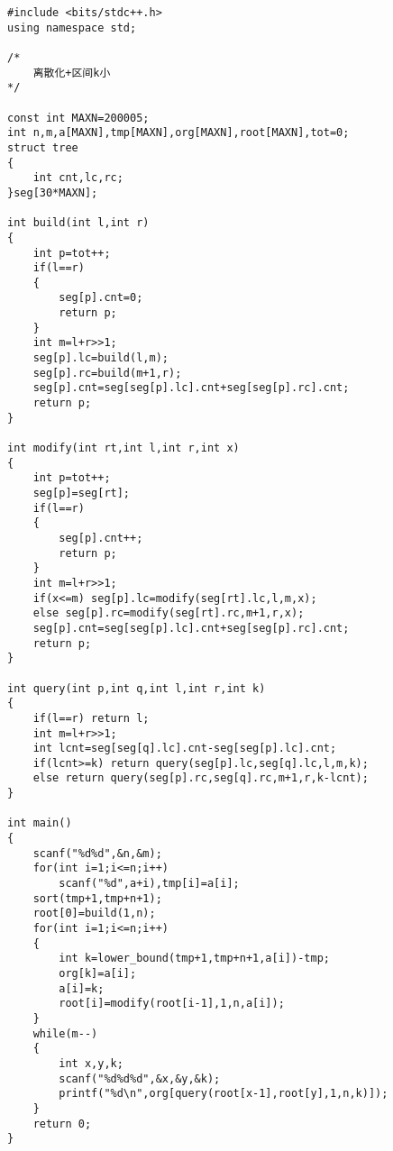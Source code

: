 \begin{lstlisting}
#include <bits/stdc++.h>
using namespace std;

/*
    离散化+区间k小
*/

const int MAXN=200005;
int n,m,a[MAXN],tmp[MAXN],org[MAXN],root[MAXN],tot=0;
struct tree
{
    int cnt,lc,rc;
}seg[30*MAXN];

int build(int l,int r)
{
    int p=tot++;
    if(l==r)
    {
        seg[p].cnt=0;
        return p;
    }
    int m=l+r>>1;
    seg[p].lc=build(l,m);
    seg[p].rc=build(m+1,r);
    seg[p].cnt=seg[seg[p].lc].cnt+seg[seg[p].rc].cnt;
    return p;
}

int modify(int rt,int l,int r,int x)
{
    int p=tot++;
    seg[p]=seg[rt];
    if(l==r)
    {
        seg[p].cnt++;
        return p;
    }
    int m=l+r>>1;
    if(x<=m) seg[p].lc=modify(seg[rt].lc,l,m,x);
    else seg[p].rc=modify(seg[rt].rc,m+1,r,x);
    seg[p].cnt=seg[seg[p].lc].cnt+seg[seg[p].rc].cnt;
    return p;
}

int query(int p,int q,int l,int r,int k)
{
    if(l==r) return l;
    int m=l+r>>1;
    int lcnt=seg[seg[q].lc].cnt-seg[seg[p].lc].cnt;
    if(lcnt>=k) return query(seg[p].lc,seg[q].lc,l,m,k);
    else return query(seg[p].rc,seg[q].rc,m+1,r,k-lcnt);
}

int main()
{
    scanf("%d%d",&n,&m);
    for(int i=1;i<=n;i++)
        scanf("%d",a+i),tmp[i]=a[i];
    sort(tmp+1,tmp+n+1);
    root[0]=build(1,n);
    for(int i=1;i<=n;i++)
    {
        int k=lower_bound(tmp+1,tmp+n+1,a[i])-tmp;
        org[k]=a[i];
        a[i]=k;
        root[i]=modify(root[i-1],1,n,a[i]);
    }
    while(m--)
    {
        int x,y,k;
        scanf("%d%d%d",&x,&y,&k);
        printf("%d\n",org[query(root[x-1],root[y],1,n,k)]);
    }
    return 0;
}
\end{lstlisting}